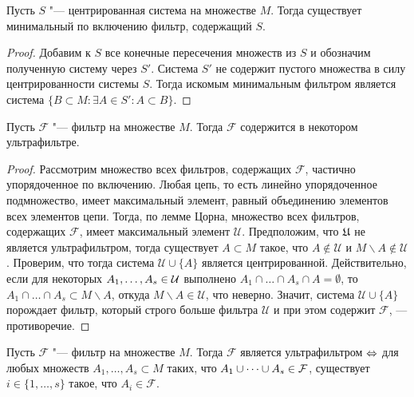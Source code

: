 \begin{proposition}
    Пусть $S$ "--- центрированная система на множестве $M$. Тогда существует минимальный по включению фильтр, содержащий $S$.
\end{proposition}

\begin{proof}
    Добавим к $S$ все конечные пересечения множеств из $S$ и обозначим полученную систему через $S'$. Система $S'$ не содержит пустого множества в силу центрированности системы $S$. Тогда искомым минимальным фильтром является система $\{B \subset M: \exists A \in S': A \subset B\}$.
\end{proof}

\begin{proposition}
    Пусть $\mathcal{F}$ "--- фильтр на множестве $M$. Тогда $\mathcal{F}$ содержится в некотором ультрафильтре.
\end{proposition}

\begin{proof}
    Рассмотрим множество всех фильтров, содержащих $\mathcal{F}$, частично упорядоченное по включению. Любая цепь, то есть линейно упорядоченное подмножество, имеет максимальный элемент, равный объединению элементов всех элементов цепи. Тогда, по лемме Цорна, множество всех фильтров, содержащих $\mathcal{F}$, имеет максимальный элемент $\mathcal{U}$. Предположим, что $\mathfrak U$ не является ультрафильтром, тогда существует $A \subset M$ такое, что $A \notin \mathcal{U}$ и $M\backslash A \notin \mathcal{U}$. Проверим, что тогда система $\mathcal{U}\cup \lbrace A\rbrace$ является центрированной. Действительно, если для некоторых $A_1, \dotsc, A_s \in \mathcal U$ выполнено $A_1\cap\ldots\cap A_s\cap A = \emptyset$, то $A_1 \cap\ldots\cap A_s\subset M\backslash
    A$, откуда $M\backslash A\in\mathcal{U}$, что неверно. Значит, система $\mathcal{U}\cup \lbrace A\rbrace$ порождает фильтр, который строго больше фильтра $\mathcal{U}$ и при этом содержит $\mathcal{F}$, --- противоречие.
\end{proof}

\begin{proposition}\label{propositionfiniteunionsmall}
    Пусть $\mathcal{F}$ "--- фильтр на множестве $M$. Тогда $\mathcal{F}$ является ультрафильтром $\Leftrightarrow$ для любых множеств $A_1, \dotsc, A_s \subset M$ таких, что $A_1 \cup \dotsb \cup A_s \in \mathcal F$, существует $i \in \{1, \dotsc, s\}$ такое, что $A_i \in \mathcal{F}$.
\end{proposition}

